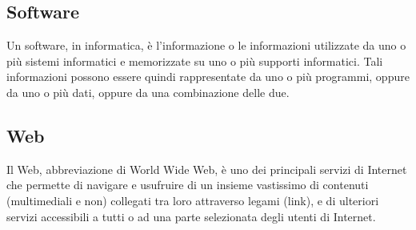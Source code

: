 \documentclass[a4paper, titlepage]{article}
\begin{document}
	\subsection{Software}
	Un software, in informatica, è l’informazione o le informazioni utilizzate da uno o più sistemi informatici
	e memorizzate su uno o più supporti informatici. Tali informazioni possono essere quindi rappresentate da uno o più programmi, oppure da uno o più dati, oppure da una combinazione
	delle due.
	
	\subsection{Web}
	Il Web, abbreviazione di World Wide Web, è uno dei principali servizi di Internet che permette di
	navigare e usufruire di un insieme vastissimo di contenuti (multimediali e non) collegati tra loro
	attraverso legami (link), e di ulteriori servizi accessibili a tutti o ad una parte selezionata degli
	utenti di Internet.
	
\end{document}
